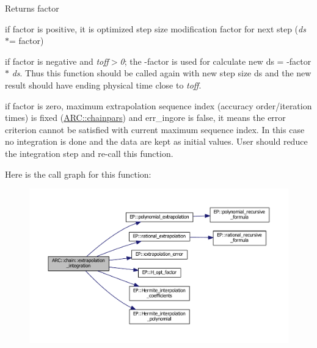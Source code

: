 \begin{DoxyReturn}{Returns}
factor
\begin{DoxyItemize}
\item if factor is positive, it is optimized step size modification factor for next step ({\itshape ds} $\ast$= factor)
\item if factor is negative and {\itshape toff$>$0}; the -\/factor is used for calculate new ds\textquotesingle{} = -\/factor $\ast$ {\itshape ds}. Thus this function should be called again with new step size ds\textquotesingle{} and the new result should have ending physical time close to {\itshape toff}.
\item if factor is zero, maximum extrapolation sequence index (accuracy order/iteration times) is fixed (\hyperlink{classARC_1_1chainpars}{A\+R\+C\+::chainpars}) and err\+\_\+ingore is false, it means the error criterion cannot be satisfied with current maximum sequence index. In this case no integration is done and the data are kept as initial values. User should reduce the integration step and re-\/call this function. 
\end{DoxyItemize}
\end{DoxyReturn}
Here is the call graph for this function\+:
\nopagebreak
\begin{figure}[H]
\begin{center}
\leavevmode
\includegraphics[width=350pt]{classARC_1_1chain_adedfb41cd82c64ca09dbc55a76b145fc_cgraph}
\end{center}
\end{figure}
\hypertarget{classARC_1_1chain_a75f1fdf8ffebcb57b5bcf26e29c84fca}{}\label{classARC_1_1chain_a75f1fdf8ffebcb57b5bcf26e29c84fca} 
